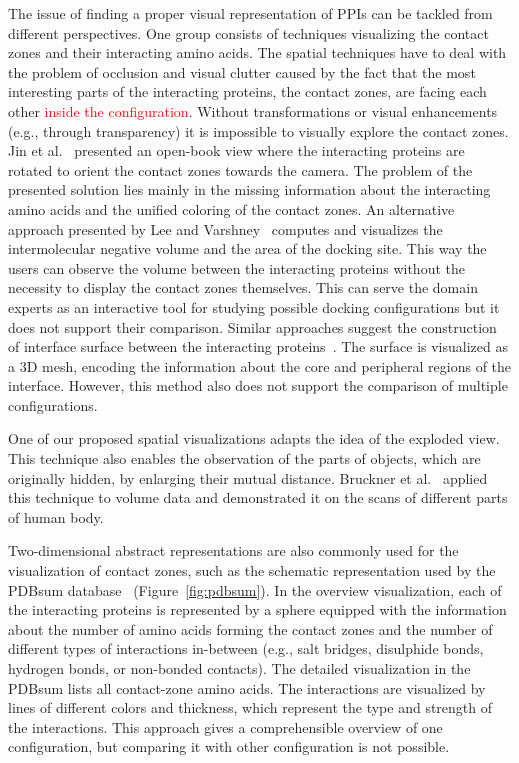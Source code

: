 \documentclass{bmcart}
\begin{document}
The issue of finding a proper visual representation of PPIs can be tackled from different perspectives. One group consists of techniques visualizing the contact zones and their interacting amino acids.
The spatial techniques have to deal with the problem of occlusion and visual clutter caused by the fact that the most interesting parts of the interacting proteins, the contact zones, are facing each other \textcolor{red}{inside the configuration}.
Without transformations or visual enhancements (e.g., through transparency) it is impossible to visually explore the contact zones.
Jin et al.~\cite{Jin2014} presented an open-book view where the interacting proteins are rotated to orient the contact zones towards the camera.
The problem of the presented solution lies mainly in the missing information about the interacting amino acids and the unified coloring of the contact zones.
An alternative approach presented by Lee and Varshney~\cite{Varshney2003} computes and visualizes the intermolecular negative volume and the area of the docking site. %
This way the users can observe the volume between the interacting proteins without the necessity to display the contact zones themselves.
This can serve the domain experts as an interactive tool for studying possible docking configurations but it does not support their comparison.
Similar approaches suggest the construction of interface surface between the interacting proteins~\cite{480793, Ban2006}.
The surface is visualized as a 3D mesh, encoding the information about the core and peripheral regions of the interface. 
However, this method also does not support the comparison of multiple configurations.

One of our proposed spatial visualizations adapts the idea of the exploded view.
This technique also enables the observation of the parts of objects, which are originally hidden, by enlarging their mutual distance.
Bruckner et al.~\cite{Bruckner2006} applied this technique to volume data and demonstrated it on the scans of different parts of human body.

Two-dimensional abstract representations are also commonly used for the visualization of contact zones, such as the schematic representation used by the PDBsum database~\cite{pdbsum} (Figure~\ref{fig:pdbsum}).
In the overview visualization, each of the interacting proteins is represented by a sphere equipped with the information about the number of amino acids forming the contact zones and the number of different types of interactions in-between (e.g., salt bridges, disulphide bonds, hydrogen bonds, or non-bonded contacts).
The detailed visualization in the PDBsum lists all contact-zone amino acids. 
The interactions are visualized by lines of different colors and thickness, which represent the type and strength of the interactions. 
This approach gives a comprehensible overview of one configuration, but comparing it with other configuration is not possible.
\end{document}
